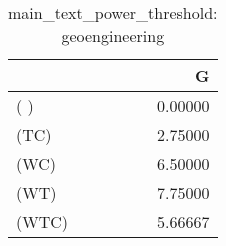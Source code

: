 \begin{table}
\centering
\caption{main_text_power_threshold: geoengineering}
\begin{tabular}{lr}
\toprule
{} &       G \\
\midrule
( )   & 0.00000 \\
(TC)  & 2.75000 \\
(WC)  & 6.50000 \\
(WT)  & 7.75000 \\
(WTC) & 5.66667 \\
\bottomrule
\end{tabular}
\end{table}
